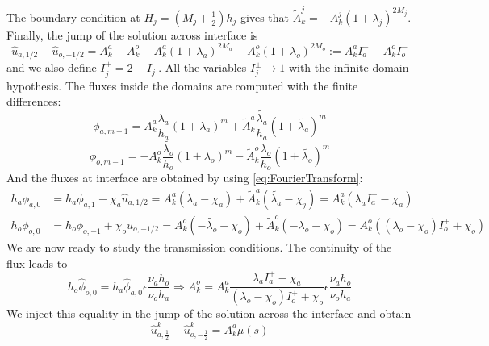 The boundary condition at $H_j = (M_j + \frac{1}{2}) h_j$ gives that
$\widetilde{A}_k^j = - A_k^j \left(1+\lambda_j\right)^{2 M_j}$.
Finally, the jump of the solution across interface is
\begin{equation*}
\widehat{u}_{a, 1/2} - 
\widehat{u}_{o, -1/2} = A_k^a - A_k^o
- A_k^a\left(1+\lambda_a\right)^{2M_a}
+ A_k^o\left(1+\lambda_o\right)^{2M_o}
	:= A_k^a I_a^{-} - A_k^o I_o^{-}
\end{equation*}
and we also define $I_j^{+} = 2-I_j^{-}$. All the variables
$I_j^{\pm}\rightarrow 1$ with the infinite domain hypothesis.
The fluxes inside the domains are computed
with the finite differences:
\begin{equation}
\phi_{a,m+1} = A_k^a \frac{\lambda_a}{h_a}
	(1+\lambda_a)^m + \widetilde{A}_k^a \frac{\widetilde{\lambda_a}}{h_a}
	(1+\widetilde{\lambda_a})^m
\end{equation}
\begin{equation}
\phi_{o,m-1} = -A_k^o \frac{\widetilde{\lambda_o}}{h_o}
	(1+\lambda_o)^m - \widetilde{A}_k^o \frac{{\lambda_o}}{h_o}
	(1+\widetilde{\lambda_o})^m
\end{equation}
And the fluxes at interface are obtained 
by using \eqref{eq:FourierTransform}:
\begin{equation*}
\begin{aligned}
h_a\phi_{a,0}&= h_a\phi_{a,1} - \chi_a \widehat{u}_{a, 1/2}
= A_k^a \left(\lambda_a - \chi_a\right) +
	\widetilde{A}_k^a\left(\widetilde{\lambda_a} - \chi_j\right)
	= A_k^a ({\lambda_a} I_a^{+} - \chi_a)
\\
h_o\phi_{o,0}&= h_o\phi_{o,-1} + \chi_o \widehat{u}_{o, -1/2}
	= A_k^o \left(-\widetilde{\lambda_o} + \chi_o\right) +
	\widetilde{A}_k^o\left(-{\lambda_o} + \chi_o\right)
	=A_k^o(({\lambda_o}-\chi_o)I_o^{+} + \chi_o)
\end{aligned}
\end{equation*}
We are now ready to study the transmission conditions.
The continuity of the flux leads to
\begin{equation}
    h_o \widehat{\phi}_{o,0} = h_a \widehat{\phi}_{a,0}
    \epsilon\frac{\nu_a h_o}
    {\nu_o h_a}
    \Rightarrow
	A_k^o = A_k^a \frac{\lambda_a I_a^{+} - \chi_a}
	{(\lambda_o - \chi_o)I_o^{+} + \chi_o}
    \epsilon\frac{\nu_a h_o}
    {\nu_o h_a}
\end{equation}
We inject this equality in the jump of the solution across
the interface and obtain
\begin{equation}
    \widehat{u}_{a,\frac{1}{2}}^k - \widehat{u}_{o,-\frac{1}{2}}^k
    = A_k^a \mu(s)
\end{equation}
